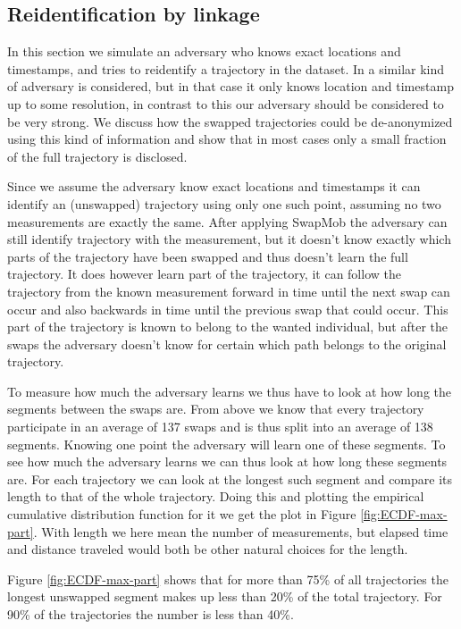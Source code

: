 \documentclass{llncs}
\begin{document}
\subsection{Reidentification by linkage}
In this section we simulate an adversary who knows exact locations and
timestamps, and tries to reidentify a trajectory in the dataset. In
\cite{demontjoye2013} a similar kind of adversary is considered, but
in that case it only knows location and timestamp up to some
resolution, in contrast to this our adversary should be considered to
be very strong. We discuss how the swapped trajectories could be
de-anonymized using this kind of information and show that in most
cases only a small fraction of the full trajectory is disclosed.

Since we assume the adversary know exact locations and timestamps it
can identify an (unswapped) trajectory using only one such point,
assuming no two measurements are exactly the same. After applying
SwapMob the adversary can still identify trajectory with the
measurement, but it doesn't know exactly which parts of the trajectory
have been swapped and thus doesn't learn the full trajectory. It does
however learn part of the trajectory, it can follow the trajectory
from the known measurement forward in time until the next swap can
occur and also backwards in time until the previous swap that could
occur. This part of the trajectory is known to belong to the wanted
individual, but after the swaps the adversary doesn't know for certain
which path belongs to the original trajectory.

To measure how much the adversary learns we thus have to look at how
long the segments between the swaps are. From above we know that every
trajectory participate in an average of 137 swaps and is thus split
into an average of 138 segments. Knowing one point the adversary will
learn one of these segments. To see how much the adversary learns we
can thus look at how long these segments are. For each trajectory we
can look at the longest such segment and compare its length to that of
the whole trajectory. Doing this and plotting the empirical cumulative
distribution function for it we get the plot in Figure
\ref{fig:ECDF-max-part}. With length we here mean the number of
measurements, but elapsed time and distance traveled would both be
other natural choices for the length.

Figure \ref{fig:ECDF-max-part} shows that for more than 75\% of all
trajectories the longest unswapped segment makes up less than 20\% of
the total trajectory. For 90\% of the trajectories the number is less
than 40\%.
\end{document}

